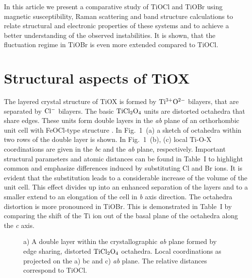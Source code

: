\documentclass[prb,preprint,draft,amsmath,showpacs]{revtex4}
\begin{document}
In this article we present a comparative study of TiOCl and TiOBr using magnetic
susceptibility, Raman scattering and band structure calculations to relate structural
and electronic properties of these systems and to achieve a better understanding of the
observed instabilities. It is shown, that the fluctuation regime in TiOBr is even more
extended compared to TiOCl.


\section{Structural aspects of TiOX}

The layered crystal structure of TiOX is formed by $\rm Ti^{3+}O^{2-}$ bilayers, that
are separated by $\rm Cl^-$ bilayers. The basic $\rm TiCl_2O_4$ units are distorted
octahedra that share edges. These units form double layers in the \emph{ab} plane of an
orthorhombic unit cell with FeOCl-type structure \cite{schaefer58,schaefer67}. In
Fig.~1~(a) a sketch of octahedra within two rows of the double layer is shown. In
Fig.~1~(b), (c) local Ti-O-X coordinations are given in the \emph{bc} and the \emph{ab}
plane, respectively. Important structural parameters and atomic distances can be found
in Table~I to highlight common and emphasize differences induced by substituting Cl and
Br ions. It is evident that the substitution leads to a considerable increase of the
volume of the unit cell. This effect divides up into an enhanced separation of the
layers and to a smaller extend to an elongation of the cell in \emph{b} axis direction.
The octahedra distortion is more pronounced in TiOBr. This is demonstrated in Table~I by
comparing the shift of the Ti ion out of the basal plane of the octahedra along the
\emph{c} axis.

\begin{figure}[t]
      \begin{center}
       \leavevmode
       \epsfxsize=9cm 
        \caption{a) A double layer within the crystallographic \emph{ab} plane
        formed by edge sharing, distorted $\rm TiCl_2O_4$ octahedra.
        Local coordinations as projected on the a) bc and c) \emph{ab} plane.
        The relative distances correspond to TiOCl. }
\label{structure}
\end{center}
\end{figure}
\end{document}
